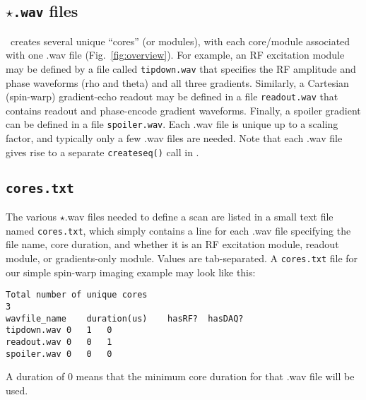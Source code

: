 \subsection{ {\tt $\star$.wav} files}
\toppe~creates several unique ``cores'' (or modules), with each core/module associated with one .wav file (Fig.~\ref{fig:overview}).
For example, an RF excitation module may be defined by a file called {\tt tipdown.wav} that specifies the RF amplitude and phase waveforms (rho and theta) and all three gradients.
Similarly, a Cartesian (spin-warp) gradient-echo readout may be defined in a file {\tt readout.wav} that contains readout and phase-encode gradient waveforms.
Finally, a spoiler gradient can be defined in a file {\tt spoiler.wav}.
Each .wav file is unique up to a scaling factor, and typically only a few .wav files are needed.
Note that each .wav file gives rise to a separate {\tt createseq()} call in \toppe.

\subsection{\tt cores.txt}
The various $\star$.wav files needed to define a scan are listed in a small text file named {\tt cores.txt}, which simply contains a line for each .wav file specifying the file name, core duration, and whether it is an RF excitation module, readout module, or gradients-only module.
Values are tab-separated.
A {\tt cores.txt} file for our simple spin-warp imaging example may look like this:
\begin{lstlisting}
Total number of unique cores
3
wavfile_name	duration(us)	hasRF?	hasDAQ?
tipdown.wav	0	1	0
readout.wav	0	0	1
spoiler.wav	0	0	0
\end{lstlisting}
A duration of 0 means that the minimum core duration for that .wav file will be used.

